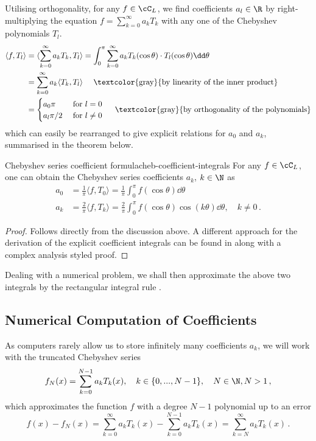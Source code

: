 \documentclass[12pt, a4paper]{article}
\newcommand{\chebyshev}{Chebyshev\xspace}
\begin{document}
  Utilising orthogonality, for any $f \in \cC_L$, we find coefficients $a_l \in \R$ by right-multiplying the equation $f = \sum_{k=0}^\infty a_k T_k$ with any one of the \chebyshev polynomials $T_l$.
  \begin{align*}
    \langle f, T_l \rangle & = \langle \sum_{k=0}^\infty a_k T_k, T_l \rangle = \int_0^\pi \sum_{k=0}^\infty a_k T_k(\cos \theta) \cdot T_l(\cos \theta) \dd\theta \\
                           & = \sum_{k=0}^\infty a_k \langle T_k, T_l \rangle \quad \text{ \textcolor{gray}{by linearity of the inner product}}                    \\
                           & = \begin{cases}
                                 a_0 \pi   & \text{ for } l = 0    \\
                                 a_l \pi/2 & \text{ for } l \neq 0
                               \end{cases} \quad \text{ \textcolor{gray}{by orthogonality of the polynomials}}
  \end{align*}
  which can easily be rearranged to give explicit relations for $a_0$ and $a_k$, summarised in the theorem below.
  \begin{theorem}{Chebyshev series coefficient formula}{cheb-coefficient-integrals}
    For any $f \in \cC_L$, one can obtain the \chebyshev series coefficients $a_k$, $k \in \N$ as
    \begin{align*}
      a_0 & = \frac{1}{\pi} \langle f, T_0 \rangle =  \frac{1}{\pi} \int_0^\pi f(\cos \theta) \dd\theta                                   \\
      a_k & = \frac{2}{\pi} \langle f, T_k \rangle = \frac{2}{\pi} \int_0^\pi f(\cos \theta) \cos(k \theta) \dd\theta, \quad k \neq 0 \,.
    \end{align*}
  \end{theorem}
  \begin{proof}
    Follows directly from the discussion above.
    A different approach for the derivation of the explicit coefficient integrals can be found in \cite{atap} along with a complex analysis styled proof.
  \end{proof}

  Dealing with a numerical problem, we shall then approximate the above two integrals by the rectangular integral rule \parencite{bonthuis-cp}.

  \subsection{Numerical Computation of Coefficients}
  \label{subsection:numerical-coeffs}
  As computers rarely allow us to store infinitely many coefficients $a_k$, we will work with the truncated \chebyshev series
  \begin{equation}
    f_N(x) = \sum_{k=0}^{N-1} a_k T_k(x), \quad k \in \{0, ..., N-1\},\quad N \in \N, N > 1\,,
    \label{eq:truncated-cheb-series}
  \end{equation}
  which approximates the function $f$ with a degree $N-1$ polynomial up to an error
  $$f(x) - f_N(x) = \sum_{k=0}^{\infty} a_k T_k(x) - \sum_{k=0}^{N-1} a_k T_k(x) = \sum_{k=N}^{\infty} a_k T_k(x) \,.$$
\end{document}
